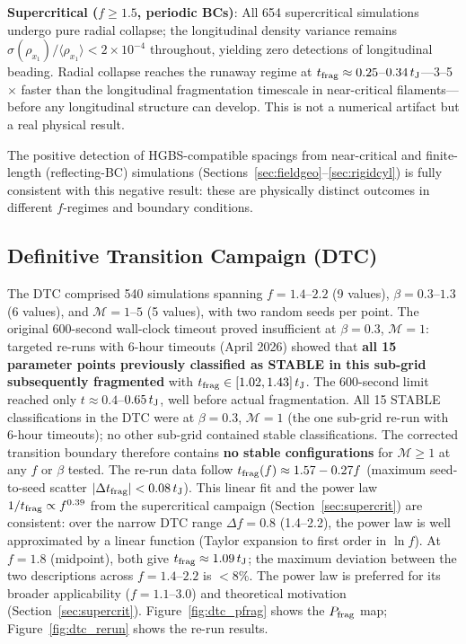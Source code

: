\documentclass[twoside,twocolumn]{mnras}
\begin{document}
\textbf{Supercritical ($f \geq 1.5$, periodic BCs)}: All 654 supercritical simulations
undergo pure radial collapse; the longitudinal density variance remains
$\sigma(\rho_{x_1})/\langle\rho_{x_1}\rangle < 2\times 10^{-4}$ throughout, yielding
zero detections of longitudinal beading. Radial collapse reaches the runaway regime
at $t_{\rm frag} \approx 0.25$--$0.34\,t_{\rm J}$---3--5$\times$ faster than the
longitudinal fragmentation timescale in near-critical filaments---before any longitudinal
structure can develop. This is not a numerical artifact but a real physical result.

The positive detection of HGBS-compatible spacings from near-critical and finite-length
(reflecting-BC) simulations (Sections~\ref{sec:fieldgeo}--\ref{sec:rigidcyl}) is fully
consistent with this negative result: these are physically distinct outcomes in
different $f$-regimes and boundary conditions.

\subsection{Definitive Transition Campaign (DTC)}
\label{sec:dtc}

The DTC comprised 540 simulations spanning $f = 1.4$--$2.2$ (9 values),
$\beta = 0.3$--$1.3$ (6 values), and $\mathcal{M} = 1$--$5$ (5 values), with
two random seeds per point. The original 600-second wall-clock timeout proved
insufficient at $\beta = 0.3$, $\mathcal{M} = 1$: targeted re-runs with
6-hour timeouts (April 2026) showed that \textbf{all 15 parameter points
previously classified as STABLE in this sub-grid subsequently fragmented}
with $t_{\rm frag} \in [1.02, 1.43]\,t_{\rm J}$. The 600-second limit reached
only $t \approx 0.4$--$0.65\,t_{\rm J}$, well before actual fragmentation.
All 15 STABLE classifications in the DTC were at $\beta = 0.3$, $\mathcal{M} = 1$ (the one sub-grid re-run with 6-hour timeouts); no other sub-grid contained stable classifications. The corrected transition boundary therefore contains \textbf{no stable configurations} for $\mathcal{M} \geq 1$ at any $f$ or $\beta$ tested. The re-run data follow $t_{\rm frag}(f) \approx 1.57 - 0.27f$
(maximum seed-to-seed scatter $|\Delta t_{\rm frag}| < 0.08\,t_{\rm J}$).
This linear fit and the power law $1/t_{\rm frag} \propto f^{0.39}$ from the
supercritical campaign (Section~\ref{sec:supercrit}) are consistent:
over the narrow DTC range $\Delta f = 0.8$ (1.4--2.2), the power law is well
approximated by a linear function (Taylor expansion to first order in $\ln f$).
At $f = 1.8$ (midpoint), both give $t_{\rm frag} \approx 1.09\,t_{\rm J}$; the
maximum deviation between the two descriptions across $f = 1.4$--$2.2$ is $<8\%$.
The power law is preferred for its broader applicability ($f = 1.1$--$3.0$) and
theoretical motivation (Section~\ref{sec:supercrit}).
Figure~\ref{fig:dtc_pfrag} shows the $P_{\rm frag}$ map; Figure~\ref{fig:dtc_rerun}
shows the re-run results.
\end{document}
